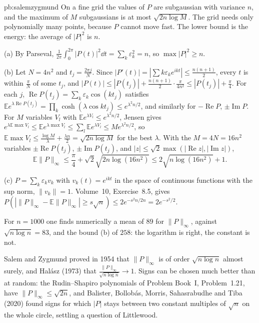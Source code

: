\begin{solution}{pb:salemzygmund}
\idea On a fine grid the values of $P$ are subgaussian with variance $n$, and the maximum of $M$ subgaussians is at most $\sqrt{2n\log M}$. The grid needs only polynomially
many points, because $P$ cannot move fast. The lower bound is the energy: the average of $|P|^2$ is $n$.

\writeup (a) By Parseval, $\frac1{2\pi}\int_0^{2\pi}|P(t)|^2\dd t=\sum_k\varepsilon_k^2=n$, so $\max|P|^2\ge n$.

(b) Let $N=4n^2$ and $t_j=\frac{2\pi j}N$. Since $|P'(t)|=|\sum k\varepsilon_ke^{ikt}|\le\frac{n(n+1)}2$, every $t$ is within $\frac\pi N$ of some $t_j$, and
$|P(t)|\le|P(t_j)|+\frac{n(n+1)}2\cdot\frac\pi{4n^2}\le|P(t_j)|+\frac\pi4$. For each $j$, $\operatorname{Re}P(t_j)=\sum_k\varepsilon_k\cos(kt_j)$ satisfies
$\mathbb Ee^{\lambda\operatorname{Re}P(t_j)}=\prod_k\cosh(\lambda\cos kt_j)\le e^{\lambda^2n/2}$, and similarly for $-\operatorname{Re}P$, $\pm\operatorname{Im}P$. For $M$ variables $V_l$ with
$\mathbb Ee^{\lambda V_l}\le e^{\lambda^2n/2}$, Jensen gives $e^{\lambda\mathbb E\max V_l}\le\mathbb Ee^{\lambda\max V_l}\le\sum_l\mathbb Ee^{\lambda V_l}\le Me^{\lambda^2n/2}$, so
$\mathbb E\max V_l\le\frac{\log M}\lambda+\frac{\lambda n}2=\sqrt{2n\log M}$ for the best $\lambda$. With the $M=4N=16n^2$ variables $\pm\operatorname{Re}P(t_j)$, $\pm\operatorname{Im}P(t_j)$, and
$|z|\le\sqrt2\max(|\operatorname{Re}z|,|\operatorname{Im}z|)$,
\[
\mathbb E\|P\|_\infty\le\frac\pi4+\sqrt2\sqrt{2n\log(16n^2)}\le2\sqrt{n\log(16n^2)}+1.
\]

(c) $P=\sum_k\varepsilon_kv_k$ with $v_k(t)=e^{ikt}$ in the space of continuous functions with the sup norm, $\|v_k\|=1$. Volume~10, Exercise~8.5, gives
$P(|\|P\|_\infty-\mathbb E\|P\|_\infty|\ge s\sqrt n)\le2e^{-s^2n/2n}=2e^{-s^2/2}$.

For $n=1000$ one finds numerically a mean of $89$ for $\|P\|_\infty$, against $\sqrt{n\log n}=83$, and the bound (b) of $258$: the logarithm is right, the constant is not.

\leads Salem and Zygmund proved in 1954 that $\|P\|_\infty$ is of order $\sqrt{n\log n}$ almost surely, and Hal\'asz (1973) that $\frac{\|P\|_\infty}{\sqrt{n\log n}}\to1$. Signs can be
chosen much better than at random: the Rudin--Shapiro polynomials of Problem Book~I, Problem~1.21, have $\|P\|_\infty\le\sqrt{2n}$, and Balister, Bollob\'as, Morris, Sahasrabudhe and
Tiba (2020) found signs for which $|P|$ stays between two constant multiples of $\sqrt n$ on the whole circle, settling a question of Littlewood.
\end{solution}


